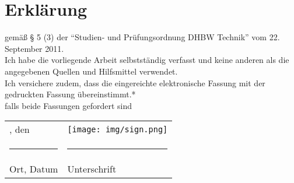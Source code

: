 \section*{Erklärung}

gemäß § 5 (3) der \enquote{Studien- und Prüfungsordnung DHBW Technik} vom 22. September 2011.\vspace*{\baselineskip}\\
Ich habe die vorliegende Arbeit selbstständig verfasst und keine anderen als die angegebenen Quellen und Hilfsmittel verwendet.\vspace*{\baselineskip}\\
Ich versichere zudem, dass die eingereichte elektronische Fassung mit der gedruckten Fassung übereinstimmt.*\vspace*{\baselineskip}\\
{\footnotesize * falls beide Fassungen gefordert sind}\\
\begin{tabularx}{\textwidth}{ll}
    \location{}, den \turnindate{} & \texttt{[image: img/sign.png]} \\
    \rule{7cm}{1pt} & \rule{5cm}{1pt}\\
    Ort, Datum & Unterschrift
\end{tabularx}
